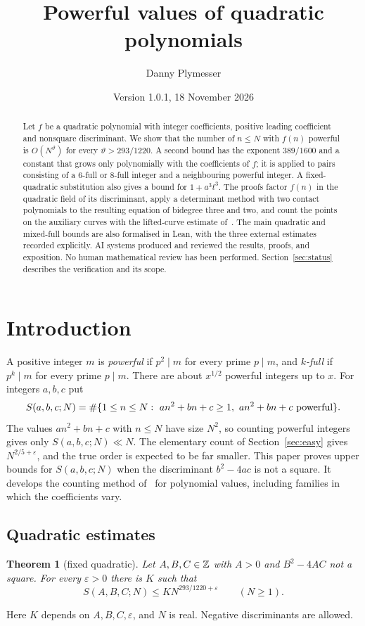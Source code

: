 \documentclass[11pt,reqno]{amsart}
\title{Powerful values of quadratic polynomials}
\author{Danny Plymesser}
\date{Version 1.0.1, 18 November 2026}
\newtheorem{theorem}{Theorem}[section]
\theoremstyle{definition}
\theoremstyle{remark}
\numberwithin{equation}{section}
\newcommand{\eps}{\varepsilon}\newcommand{\card}{\#}
\newcommand{\lean}{Lean}
\begin{document}
\begin{abstract}
Let $f$ be a quadratic polynomial with integer coefficients, positive
leading coefficient and nonsquare discriminant. We show that the number of
$n\le N$ with $f(n)$ powerful is $O(N^{\vartheta})$ for every
$\vartheta>293/1220$. A second bound has the exponent $389/1600$ and a constant
that grows only polynomially with the coefficients of $f$; it is applied to
pairs consisting of a $6$-full or $8$-full integer and a neighbouring
powerful integer. A fixed-quadratic substitution also gives a bound for
$1+a^3t^3$. The proofs factor $f(n)$ in the quadratic
field of its discriminant, apply a determinant method with two contact
polynomials to the resulting equation of bidegree three and two, and count
the points on the auxiliary curves with the lifted-curve estimate
of~\cite{powerful}. The main quadratic and mixed-full bounds are also
formalised in \lean, with the three external estimates recorded explicitly.
AI systems produced and reviewed the results, proofs, and exposition.
No human mathematical review has been performed.
Section~\ref{sec:status} describes the verification and its scope.
\end{abstract}

\maketitle

\section{Introduction}\label{sec:intro}
A positive integer $m$ is \emph{powerful} if $p^2\mid m$ for every prime
$p\mid m$, and \emph{$k$-full} if $p^k\mid m$ for every prime $p\mid m$.
There are about $x^{1/2}$ powerful integers up to $x$. For integers $a,b,c$
put
\[
 S(a,b,c;N)=\card\{1\le n\le N:\ an^2+bn+c\ge1,\ an^2+bn+c\textnormal{ powerful}\}.
\]
The values $an^2+bn+c$ with $n\le N$ have size $N^2$, so counting powerful
integers gives only $S(a,b,c;N)\ll N$. The elementary count of
Section~\ref{sec:easy} gives $N^{2/5+\eps}$, and the true order is expected
to be far smaller. This paper proves upper bounds for $S(a,b,c;N)$ when the
discriminant $b^2-4ac$ is not a square. It develops the counting method
of~\cite{powerful} for polynomial values, including families in which the
coefficients vary.

\subsection{Quadratic estimates}\label{sec:results}
\begin{theorem}[fixed quadratic]\label{thm:fixed}
Let $A,B,C\in\mathbb Z$ with $A>0$ and $B^2-4AC$ not a square.
For every $\eps>0$ there is $K$ such that
\[
 S(A,B,C;N)\le KN^{293/1220+\eps}\qquad(N\ge1).
\]
\end{theorem}
Here $K$ depends on $A,B,C,\eps$, and $N$ is real. Negative discriminants
are allowed.
\end{document}
